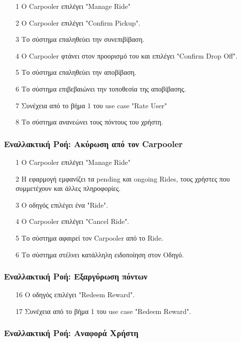 \begin{enumerate}
    \item[1] O Carpooler επιλέγει "Manage Ride"
    \item[2] Ο Carpooler επιλέγει "Confirm Pickup".
    \item[3] Το σύστημα επαληθεύει την συνεπιβίβαση.
    \item[4] O Carpooler φτάνει στον προορισμό του και επιλέγει "Confirm Drop Off".
    \item[5] Το σύστημα επαληθεύει την αποβίβαση.
    \item[6] Το σύστημα επιβεβαιώνει την τοποθεσία της αποβίβασης.
    \item[7] Συνέχεια από το βήμα 1 του use case "Rate User"
    \item[8] Το σύστημα ανανεώνει τους πόντους του χρήστη.
\end{enumerate}

\subsubsection{Εναλλακτική Ροή: Ακύρωση από τον Carpooler}

\begin{enumerate}
    \item[1] O Carpooler επιλέγει "Manage Ride"
    \item[2] Η εφαρμογή εμφανίζει τα pending και ongoing Rides, τους χρήστες που συμμετέχουν και άλλες
        πληροφορίες.
    \item[3] Ο οδηγός επιλέγει ένα "Ride".
    \item[4] Ο Carpooler επιλέγει "Cancel Ride".
    \item[5] Το σύστημα αφαιρεί τον Carpooler από το Ride.
    \item[6] Το σύστημα στέλνει κατάλληλη ειδοποίηση στον Οδηγό.
\end{enumerate}

\subsubsection{Εναλλακτική Ροή: Εξαργύρωση πόντων}

\begin{enumerate}
    \item[16] Ο οδηγός επιλέγει "Redeem Reward".
    \item[17] Συνέχεια από το βήμα 1 του use case "Redeem Reward".
\end{enumerate}

\subsubsection{Εναλλακτική Ροή: Αναφορά Χρήστη}

